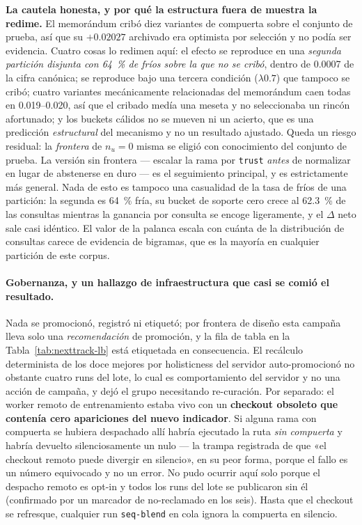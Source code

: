 \documentclass[11pt]{article}
\begin{document}
\textbf{La cautela honesta, y por qué la estructura fuera de muestra la redime.} El
memorándum cribó diez variantes de compuerta sobre el conjunto de prueba, así que
su $+\num{0.02027}$ archivado era optimista por selección y no podía ser evidencia.
Cuatro cosas lo redimen aquí: el efecto se reproduce en una \emph{segunda partición
disjunta con \SI{64}{\percent} de fríos sobre la que no se cribó}, dentro de
\num{0.0007} de la cifra canónica; se reproduce bajo una tercera condición
($\lambda\num{0.7}$) que tampoco se cribó; cuatro variantes mecánicamente
relacionadas del memorándum caen todas en \numrange{0.019}{0.020}, así que el
cribado medía una meseta y no seleccionaba un rincón afortunado; y los buckets
cálidos no se mueven ni un acierto, que es una predicción \emph{estructural} del
mecanismo y no un resultado ajustado. Queda un riesgo residual: la \emph{frontera}
de $n_u = 0$ misma se eligió con conocimiento del conjunto de prueba. La versión
sin frontera --- escalar la rama por \texttt{trust} \emph{antes} de normalizar en
lugar de abstenerse en duro --- es el seguimiento principal, y es estrictamente más
general. Nada de esto es tampoco una casualidad de la tasa de fríos de una
partición: la segunda es \SI{64}{\percent} fría, su bucket de soporte cero crece al
\SI{62.3}{\percent} de las consultas mientras la ganancia por consulta se encoge
ligeramente, y el $\Delta$ neto sale casi idéntico. El valor de la palanca escala
con cuánta de la distribución de consultas carece de evidencia de bigramas, que es
la mayoría en cualquier partición de este corpus.

\paragraph{Gobernanza, y un hallazgo de infraestructura que casi se comió el
resultado.} Nada se promocionó, registró ni etiquetó; por frontera de diseño esta
campaña lleva solo una \emph{recomendación} de promoción, y la fila de tabla en la
Tabla~\ref{tab:nexttrack-lb} está etiquetada en consecuencia. El recálculo determinista de
los doce mejores por holisticness del servidor auto-promocionó no obstante cuatro
runs del lote, lo cual es comportamiento del servidor y no una acción de campaña, y
dejó el grupo necesitando re-curación. Por separado: el worker remoto de
entrenamiento estaba vivo con un \textbf{checkout obsoleto que contenía cero
apariciones del nuevo indicador}. Si alguna rama con compuerta se hubiera
despachado allí habría ejecutado la ruta \emph{sin compuerta} y habría devuelto
silenciosamente un nulo --- la trampa registrada de que «el checkout remoto puede
divergir en silencio», en su peor forma, porque el fallo es un número equivocado y
no un error. No pudo ocurrir aquí solo porque el despacho remoto es opt-in y todos
los runs del lote se publicaron sin él (confirmado por un marcador de no-reclamado
en los seis). Hasta que el checkout se refresque, cualquier run \texttt{seq-blend}
en cola ignora la compuerta en silencio.
\end{document}
